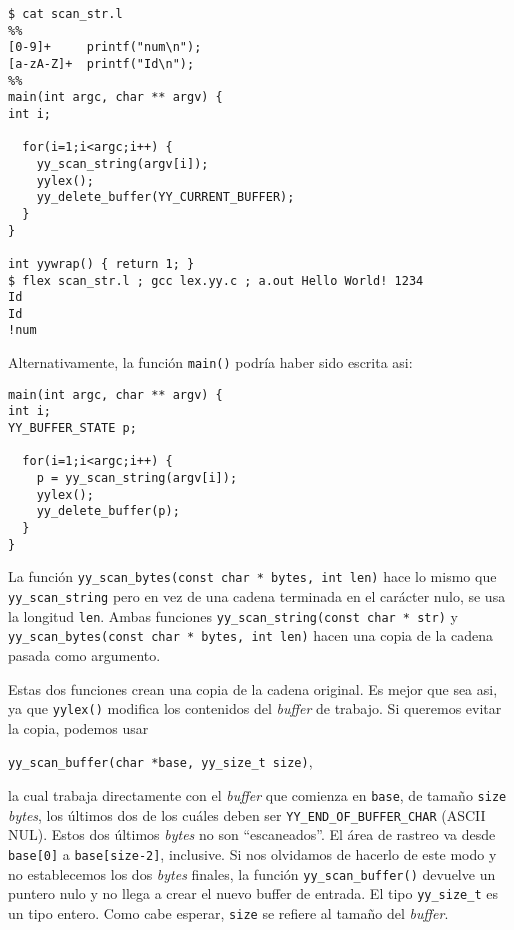 \begin{verbatim}
$ cat scan_str.l
%%
[0-9]+     printf("num\n");
[a-zA-Z]+  printf("Id\n");
%%
main(int argc, char ** argv) {
int i;
 
  for(i=1;i<argc;i++) {
    yy_scan_string(argv[i]);
    yylex();
    yy_delete_buffer(YY_CURRENT_BUFFER);
  }
}
 
int yywrap() { return 1; }
$ flex scan_str.l ; gcc lex.yy.c ; a.out Hello World! 1234
Id
Id
!num                       
\end{verbatim}
Alternativamente, la función \verb|main()| podría haber sido escrita asi:
\begin{verbatim}
main(int argc, char ** argv) {
int i;
YY_BUFFER_STATE p;

  for(i=1;i<argc;i++) {
    p = yy_scan_string(argv[i]);
    yylex();
    yy_delete_buffer(p);
  }
}
\end{verbatim}
La funci\'on \verb|yy_scan_bytes(const char * bytes, int len)| hace lo mismo que 
\verb|yy_scan_string| pero en vez de una cadena terminada en
el car\'acter nulo, se usa la longitud \verb|len|.
Ambas funciones \verb|yy_scan_string(const char * str)| y
\verb|yy_scan_bytes(const char * bytes, int len)| hacen una copia
de la cadena pasada como argumento.

Estas dos funciones crean una copia de la cadena original. Es mejor que sea asi, ya que \verb|yylex()|
modifica los contenidos del \emph{buffer} de trabajo. Si queremos evitar la copia,
podemos usar 

\verb|yy_scan_buffer(char *base, yy_size_t size)|,

la cual trabaja directamente con el \emph{buffer} que comienza en \verb|base|, 
de tamaño \verb|size| \emph{bytes}, los últimos dos de los cuáles deben
ser \verb|YY_END_OF_BUFFER_CHAR| (ASCII  NUL).   
Estos dos últimos \emph{bytes} no son ``escaneados''. El área de rastreo va
desde \verb|base[0]| a \verb|base[size-2]|, inclusive.
Si nos olvidamos de hacerlo de este modo y no establecemos los dos \emph{bytes} finales,
la función \verb|yy_scan_buffer()| devuelve un puntero nulo
y no llega a crear el nuevo buffer de entrada.
El tipo  \verb|yy_size_t| es un tipo entero.
Como cabe esperar, \verb|size| se refiere al tamaño del \emph{buffer}.

